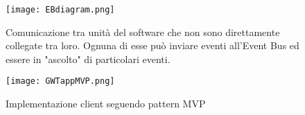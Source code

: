 \FloatBarrier
\begin{figure}[!htb]
\centering%
\texttt{[image: EBdiagram.png]}%
\caption{Comunicazione tra unit\`a del software che non sono direttamente collegate tra loro. Ognuna di esse pu\`o inviare eventi all'Event Bus ed essere in "ascolto" di  particolari eventi.}\label{fig:mvpEB}%
\end{figure}

\FloatBarrier
\begin{figure}[!htb]
\centering
\texttt{[image: GWTappMVP.png]}
\caption{Implementazione client seguendo pattern MVP}
\label{fig:mvpApp}
\end{figure}

